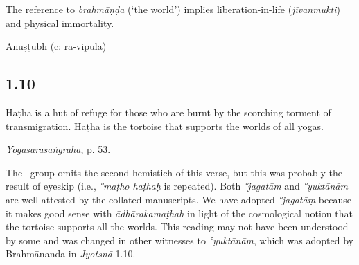 \begin{ekdosis}
\begin{testimonia}[hp01_009]
\end{testimonia}

\begin{philcomm}[hp01_009]        
The reference to \emph{brahmāṇḍa} (‘the world’) implies liberation-in-life (\emph{jīvanmukti}) and physical immortality.  
\end{philcomm}

\begin{metre}[hp01_009]
Anuṣṭubh (c: ra-vipulā)
\end{metre}

\subsection*{1.10}
\begin{translation}[hp01_010]
Haṭha is a hut of refuge for those who are burnt by the scorching torment of transmigration. Haṭha is the tortoise that supports the worlds of all yogas.
\end{translation}

\begin{testimonia}[hp01_010]
\emph{Yogasārasaṅgraha}, p. 53.

\begin{versinnote}
\end{versinnote}

\end{testimonia}

\begin{philcomm}[hp01_010] 

The \textalpha\ group omits the second hemistich of this verse, but this was probably the result of eyeskip (i.e., \emph{°maṭho haṭhaḥ} is repeated). Both \emph{°jagatām} and \emph{°yuktānām} are well attested by the collated manuscripts. We have adopted \emph{°jagatāṃ} because it makes good sense with  \emph{ādhārakamaṭhah} in light of the cosmological notion that the tortoise supports all the worlds. This reading may not have been understood by some and was changed in other witnesses to \emph{°yuktānām}, which was adopted by Brahmānanda in \emph{Jyotsnā} 1.10.       
\end{philcomm}


\end{ekdosis}
